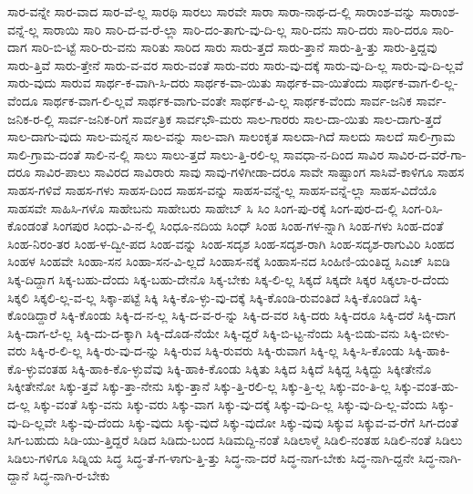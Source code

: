 {ಸಾರ-ವನ್ನೇ
ಸಾರ-ವಾದ
ಸಾರ-ವೆ-ಲ್ಲ
ಸಾರಥಿ
ಸಾರಲು
ಸಾರವೇ
ಸಾರಾ
ಸಾರಾ-ನಾಥ-ದ-ಲ್ಲಿ
ಸಾರಾಂಶ-ವನ್ನು
ಸಾರಾಂಶ-ವನ್ನೆ-ಲ್ಲ
ಸಾರಾಯಿ
ಸಾರಿ
ಸಾರಿ-ದ-ವ-ರೆ-ಲ್ಲಾ
ಸಾರಿ-ದಂ-ತಾಗು-ವು-ದಿ-ಲ್ಲ
ಸಾರಿ-ದನು
ಸಾರಿ-ದರು
ಸಾರಿ-ದರೂ
ಸಾರಿ-ದಾಗ
ಸಾರಿ-ಬಿ-ಟ್ಟೆ
ಸಾರಿ-ರು-ವನು
ಸಾರಿತು
ಸಾರಿದ
ಸಾರು
ಸಾರು-ತ್ತದೆ
ಸಾರು-ತ್ತಾನೆ
ಸಾರು-ತ್ತಿ-ತ್ತು
ಸಾರು-ತ್ತಿದ್ದವು
ಸಾರು-ತ್ತಿವೆ
ಸಾರು-ತ್ತೇನೆ
ಸಾರು-ವ-ವರ
ಸಾರು-ವಂತೆ
ಸಾರು-ವರು
ಸಾರು-ವು-ದಕ್ಕೆ
ಸಾರು-ವು-ದಿ-ಲ್ಲ
ಸಾರು-ವು-ದಿ-ಲ್ಲವೆ
ಸಾರು-ವುದು
ಸಾರುವ
ಸಾರ್ಥ-ಕ-ವಾಗಿ-ಸಿ-ದರು
ಸಾರ್ಥಕ-ವಾ-ಯಿತು
ಸಾರ್ಥಕ-ವಾ-ಯಿತೆಂದು
ಸಾರ್ಥಕ-ವಾಗ-ಲಿ-ಲ್ಲ-ವೆಂದೂ
ಸಾರ್ಥಕ-ವಾಗ-ಲಿ-ಲ್ಲವೆ
ಸಾರ್ಥಕ-ವಾಗು-ವಂತೇ
ಸಾರ್ಥಕ-ವಿ-ಲ್ಲ
ಸಾರ್ಥಕ-ವೆಂದು
ಸಾರ್ವ-ಜನಿಕ
ಸಾರ್ವ-ಜನಿಕ-ರ-ಲ್ಲಿ
ಸಾರ್ವ-ಜನಿಕ-ರಿಗೆ
ಸಾರ್ವತ್ರಿಕ
ಸಾರ್ವಭೌ-ಮರು
ಸಾಲ-ಗಾರರು
ಸಾಲ-ದಾ-ಯಿತು
ಸಾಲ-ದಾಗು-ತ್ತದೆ
ಸಾಲ-ದಾಗು-ವುದು
ಸಾಲ-ಮನ್ನನ
ಸಾಲ-ವನ್ನು
ಸಾಲ-ವಾಗಿ
ಸಾಲಂಕೃತ
ಸಾಲದಾ-ಗಿದೆ
ಸಾಲದು
ಸಾಲದೆ
ಸಾಲಿ-ಗ್ರಾಮ
ಸಾಲಿ-ಗ್ರಾಮ-ದಂತೆ
ಸಾಲಿ-ನ-ಲ್ಲಿ
ಸಾಲು
ಸಾಲು-ತ್ತದೆ
ಸಾಲು-ತ್ತಿ-ರಲಿ-ಲ್ಲ
ಸಾವಧಾ-ನ-ದಿಂದ
ಸಾವಿರ
ಸಾವಿರ-ದ-ವರೆ-ಗಾ-ದರೂ
ಸಾವಿರ-ಪಾಲು
ಸಾವಿರದ
ಸಾವಿರಾರು
ಸಾವು
ಸಾವು-ಗಳಿಗೀಡಾ-ದರೂ
ಸಾವೇ
ಸಾಷ್ಟಾಂಗ
ಸಾಸಿವೆ-ಕಾಳಿಗೂ
ಸಾಹಸ
ಸಾಹಸ-ಗಳಿವೆ
ಸಾಹಸ-ಗಳು
ಸಾಹಸ-ದಿಂದ
ಸಾಹಸ-ವನ್ನು
ಸಾಹಸ-ವನ್ನೆ-ಲ್ಲ
ಸಾಹಸ-ವನ್ನೆ-ಲ್ಲಾ
ಸಾಹಸ-ವಿದೆಯೊ
ಸಾಹಸವೇ
ಸಾಹಿಸಿ-ಗಳೊ
ಸಾಹೇಬನು
ಸಾಹೇಬರು
ಸಾಹೇಬ್
ಸಿ
ಸಿಂ
ಸಿಂಗ-ಪು-ರಕ್ಕೆ
ಸಿಂಗ-ಪುರ-ದ-ಲ್ಲಿ
ಸಿಂಗ-ರಿಸಿ-ಕೊಂಡಂತೆ
ಸಿಂಗಪುರ
ಸಿಂಧು-ವಿ-ನ-ಲ್ಲಿ
ಸಿಂಧೂ-ನದಿಯ
ಸಿಂಧ್
ಸಿಂಹ
ಸಿಂಹ-ಗಳ-ನ್ನಾಗಿ
ಸಿಂಹ-ಗಳು
ಸಿಂಹ-ದಂತೆ
ಸಿಂಹ-ನಿರಂ-ತರ
ಸಿಂಹ-ಳ-ದ್ವೀ-ಪದ
ಸಿಂಹ-ವನ್ನು
ಸಿಂಹ-ಸದೃಶ
ಸಿಂಹ-ಸದೃಶ-ರಾಗಿ
ಸಿಂಹ-ಸದೃಶ-ರಾಗುವಿರಿ
ಸಿಂಹದ
ಸಿಂಹಳ
ಸಿಂಹವೇ
ಸಿಂಹಾ-ಸನ
ಸಿಂಹಾ-ಸನ-ವಿ-ಲ್ಲದೆ
ಸಿಂಹಾಸ-ನಕ್ಕೆ
ಸಿಂಹಾಸ-ನದ
ಸಿಂಹಿಣಿ-ಯಂತಿದ್ದ
ಸಿಎಚ್
ಸಿಐಡಿ
ಸಿಕ್ಕ-ದಿದ್ದಾಗ
ಸಿಕ್ಕ-ಬಹು-ದೆಂದು
ಸಿಕ್ಕ-ಬಹು-ದೇನೊ
ಸಿಕ್ಕ-ಬೇಕು
ಸಿಕ್ಕ-ಲಿ-ಲ್ಲ
ಸಿಕ್ಕದೆ
ಸಿಕ್ಕದೇ
ಸಿಕ್ಕರ
ಸಿಕ್ಕಲಾ-ರ-ದೆಂದು
ಸಿಕ್ಕಲಿ
ಸಿಕ್ಕಲಿ-ಲ್ಲ-ವ-ಲ್ಲ
ಸಿಕ್ಕಾ-ಪಟ್ಟೆ
ಸಿಕ್ಕಿ
ಸಿಕ್ಕಿ-ಕೊ-ಳ್ಳು-ವು-ದಕ್ಕೆ
ಸಿಕ್ಕಿ-ಕೊಂಡಿ-ರುವಂತಿದೆ
ಸಿಕ್ಕಿ-ಕೊಂಡಿದೆ
ಸಿಕ್ಕಿ-ಕೊಂಡಿದ್ದಾರೆ
ಸಿಕ್ಕಿ-ಕೊಂಡು
ಸಿಕ್ಕಿ-ದ-ನ-ಲ್ಲ
ಸಿಕ್ಕಿ-ದ-ವ-ರ-ನ್ನು
ಸಿಕ್ಕಿ-ದ-ವರ
ಸಿಕ್ಕಿ-ದರು
ಸಿಕ್ಕಿ-ದರೂ
ಸಿಕ್ಕಿ-ದರೆ
ಸಿಕ್ಕಿ-ದಾಗ
ಸಿಕ್ಕಿ-ದಾಗ-ಲೆ-ಲ್ಲ
ಸಿಕ್ಕಿ-ದು-ದ-ಕ್ಕಾಗಿ
ಸಿಕ್ಕಿ-ದೊಡ-ನೆಯೇ
ಸಿಕ್ಕಿ-ದ್ದರೆ
ಸಿಕ್ಕಿ-ಬಿ-ಟ್ಟ-ನೆಂದು
ಸಿಕ್ಕಿ-ಬಿಡು-ವನು
ಸಿಕ್ಕಿ-ಬೀಳು-ವರು
ಸಿಕ್ಕಿ-ರ-ಲಿ-ಲ್ಲ
ಸಿಕ್ಕಿ-ರು-ವು-ದ-ನ್ನು
ಸಿಕ್ಕಿ-ರುವ
ಸಿಕ್ಕಿ-ರುವರು
ಸಿಕ್ಕಿ-ರುವಾಗ
ಸಿಕ್ಕಿ-ಲ್ಲ
ಸಿಕ್ಕಿ-ಸಿ-ಕೊಂಡು
ಸಿಕ್ಕಿ-ಹಾಕಿ-ಕೊ-ಳ್ಳುವಂತಹ
ಸಿಕ್ಕಿ-ಹಾಕಿ-ಕೊ-ಳ್ಳುವೆವು
ಸಿಕ್ಕಿ-ಹಾಕಿ-ಕೊಂಡು
ಸಿಕ್ಕಿತು
ಸಿಕ್ಕಿದ
ಸಿಕ್ಕಿದೆ
ಸಿಕ್ಕಿದ್ದ
ಸಿಕ್ಕಿದ್ದು
ಸಿಕ್ಕೀತೇನೊ
ಸಿಕ್ಕೀತೇನೋ
ಸಿಕ್ಕು-ತ್ತವೆ
ಸಿಕ್ಕು-ತ್ತಾ-ನೇನು
ಸಿಕ್ಕು-ತ್ತಾನೆ
ಸಿಕ್ಕು-ತ್ತಿ-ರಲಿ-ಲ್ಲ
ಸಿಕ್ಕು-ತ್ತಿ-ಲ್ಲ
ಸಿಕ್ಕು-ವಂ-ತಿ-ಲ್ಲ
ಸಿಕ್ಕು-ವಂತ-ಹು-ದ-ಲ್ಲ
ಸಿಕ್ಕು-ವಂತೆ
ಸಿಕ್ಕು-ವನು
ಸಿಕ್ಕು-ವರು
ಸಿಕ್ಕು-ವಾಗ
ಸಿಕ್ಕು-ವು-ದಕ್ಕೆ
ಸಿಕ್ಕು-ವು-ದಿ-ಲ್ಲ
ಸಿಕ್ಕು-ವು-ದಿ-ಲ್ಲ-ವೆಂದು
ಸಿಕ್ಕು-ವು-ದಿ-ಲ್ಲವೇ
ಸಿಕ್ಕು-ವು-ದೆಂದು
ಸಿಕ್ಕು-ವುದು
ಸಿಕ್ಕು-ವುದೆ
ಸಿಕ್ಕು-ವುದೋ
ಸಿಕ್ಕು-ವುವು
ಸಿಕ್ಕುವ
ಸಿಕ್ಕುವ-ವ-ರೆಗೆ
ಸಿಗ-ದಂತೆ
ಸಿಗ-ಬಹುದು
ಸಿಡಿ-ಯು-ತ್ತಿದ್ದರೆ
ಸಿಡಿದ
ಸಿಡಿದು-ಬಂದ
ಸಿಡಿಮದ್ದಿ-ನಂತೆ
ಸಿಡಿಲಾಳ್ಮೆ
ಸಿಡಿಲಿ-ನಂತಹ
ಸಿಡಿಲಿ-ನಂತೆ
ಸಿಡಿಲು
ಸಿಡಿಲು-ಗಳಿಗೂ
ಸಿಡ್ನಿಯ
ಸಿದ್ಧ
ಸಿದ್ಧ-ತೆ-ಗ-ಳಾಗು-ತ್ತಿ-ತ್ತು
ಸಿದ್ಧ-ನಾ-ದರೆ
ಸಿದ್ಧ-ನಾಗ-ಬೇಕು
ಸಿದ್ಧ-ನಾಗಿ-ದ್ದನೇ
ಸಿದ್ಧ-ನಾಗಿ-ದ್ದಾನೆ
ಸಿದ್ಧ-ನಾಗಿ-ರ-ಬೇಕು
}
